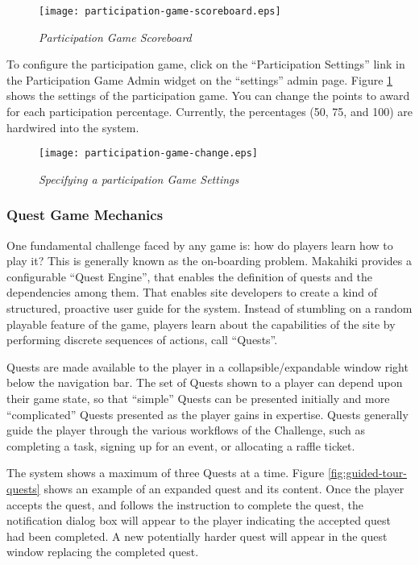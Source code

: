 \begin{figure}[!ht]
  \center
  \texttt{[image: participation-game-scoreboard.eps]}
  \caption{\em Participation Game Scoreboard}
  \label{fig:participation-game-scoreboard}
\end{figure}

To configure the participation game, click on the ``Participation Settings'' link in the Participation Game Admin widget on the ``settings'' admin page. Figure \ref{fig:participation-game-scoreboard} shows the settings of the participation game. You can change the points to award for each participation percentage. Currently, the percentages (50, 75, and 100) are hardwired into the system.

\begin{figure}[!ht]
  \center
  \texttt{[image: participation-game-change.eps]}
  \caption{\em Specifying a participation Game Settings}
  \label{fig:participation-game-change}
\end{figure}

\subsubsection{Quest Game Mechanics}
One fundamental challenge faced by any game is: how do players learn how to play it? This is generally known as the on-boarding problem. Makahiki provides a configurable ``Quest Engine'', that enables the definition of quests and the dependencies among them. That enables site developers to create a kind of structured, proactive user guide for the system. Instead of stumbling on a random playable feature of the game, players learn about the capabilities of the site by performing discrete sequences of actions, call ``Quests''. 

Quests are made available to the player in a collapsible/expandable window right below the navigation bar. The set of Quests shown to a player can depend upon their game state, so that ``simple'' Quests can be presented initially and more ``complicated'' Quests presented as the player gains in expertise. Quests generally guide the player through the various workflows of the Challenge, such as completing a task, signing up for an event, or allocating a raffle ticket.

The system shows a maximum of three Quests at a time. Figure \ref{fig:guided-tour-quests} shows an example of an expanded quest and its content. Once the player accepts the quest, and follows the instruction to complete the quest, the notification dialog box will appear to the player indicating the accepted quest had been completed. A new potentially harder quest will appear in the quest window replacing the completed quest.

